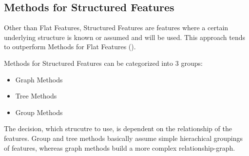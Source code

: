 \subsection{Methods for Structured Features}
\label{sec:methods.structured}


Other than Flat Features, Structured Features are features where a certain
underlying structure is known or assumed and will be used. This approach tends
to outperform Methods for Flat Features (\cite{Tang:14}).

Methods for Structured Features can be categorized into $3$ groups:

\begin{itemize}
  \item Graph Methods
  \item Tree Methods
  \item Group Methods
\end{itemize}

The decision, which strucutre to use, is dependent on the relationship of the
features. Group and tree methods basically assume simple hierachical groupings
of features, whereas graph methods build a more complex relationship-graph.



